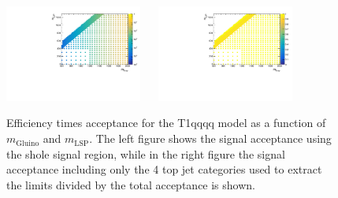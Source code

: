\begin{figure}[h!]
  \begin{center}
    \includegraphics[width=0.4\textwidth]{figures/jetRanking/T1qqqq/eff/T1qqqq_merging_9_cats.pdf} ~~
    \includegraphics[width=0.4\textwidth]{figures/susyResults/T1qqqq_doubleRatioAcceptance.pdf} \\
    \caption{
      Efficiency times acceptance for the T1qqqq model as a function of $m_{\mathrm{Gluino}}$ and $m_{\mathrm{LSP}}$.
      The left figure shows the signal acceptance using the shole signal region, 
      while in the right figure the signal acceptance including only the 4 top jet categories used to extract the limits divided by the total acceptance is shown.
    }
    \label{fig:sig-eff-T1qqqq}
  \end{center}
\end{figure}

